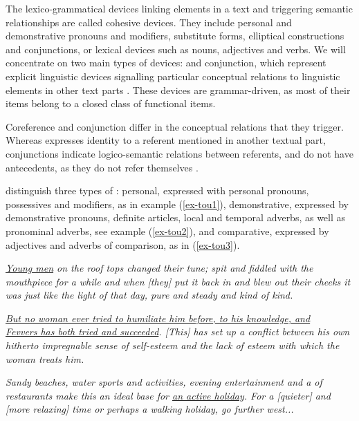 \documentclass[output=paper]{langsci/langscibook.cls}
\begin{document}
The lexico-grammatical devices linking elements in a text and triggering semantic relationships are called {\sc cohesive devices}. They include personal and demonstrative pronouns and modifiers, substitute forms, elliptical constructions and conjunctions, or lexical devices such as nouns, adjectives and verbs. We will concentrate on two main types of devices:  and conjunction, which represent explicit linguistic devices signalling particular conceptual relations to linguistic elements in other text parts \citep[see][]{HallidayHasan1976, HallidayMatthiessen2013}. These devices are grammar-driven, as most of their items belong to a closed class of functional items.

Coreference and conjunction differ in the conceptual relations that they trigger. Whereas  expresses identity to a referent mentioned in another textual part, conjunctions indicate logico-semantic relations between referents, and do not have antecedents, as they do not refer themselves \citep[see][]{LapshinovaKunz2014,KunzLapshinova2015}.

\citet{HallidayHasan1976} distinguish three types of : {\sc personal}, expressed with personal pronouns, possessives and modifiers, as in example (\ref{ex-tou1}), {\sc demonstrative}, expressed by demonstrative pronouns, definite articles, local and temporal adverbs, as well as pronominal adverbs, see example (\ref{ex-tou2}), and {\sc comparative}, expressed by adjectives and adverbs of comparison, as in (\ref{ex-tou3}). 

\ea
\label{ex-tou1}
 \textsl{\underline{Young men} on the roof tops changed their tune; spit and fiddled with the mouthpiece for a while and when [they] put it back in and blew out their cheeks it was just like the light of that day, pure and steady and kind of kind.}
\z

\ea
\label{ex-tou2}
 \textsl{\underline{But no woman ever tried to humiliate him before, to his knowledge, and}\\ \underline{Fevvers has both tried and succeeded}. [This] has set up a conflict between his own hitherto impregnable sense of self-esteem and the lack of esteem with which the woman treats him.}
\z

\ea
\label{ex-tou3}
 \textsl{Sandy beaches, water sports and activities, evening entertainment and a  of restaurants make this an ideal base for \underline{an active holiday}. For a [quieter] and [more relaxing] time or perhaps a walking holiday, go further west...} 
\z
\end{document}
